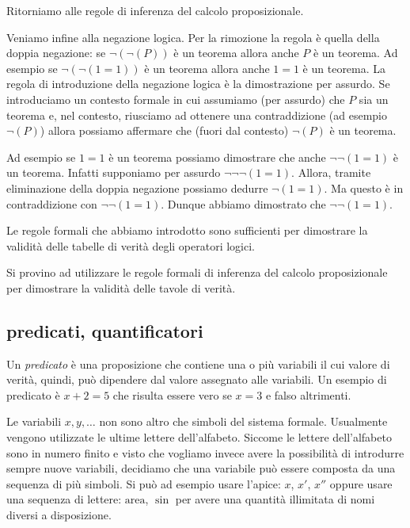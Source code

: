 Ritorniamo alle regole di inferenza del calcolo proposizionale.

Veniamo infine alla negazione logica. 
%
%
Per la rimozione la regola è quella della doppia negazione: 
se $\lnot (\lnot (P))$ è un teorema allora anche $P$ è un teorema.
Ad esempio se $\lnot (\lnot (1=1))$ è un teorema allora anche $1=1$ 
è un teorema.
%
La regola di introduzione della negazione logica è la 
dimostrazione per assurdo.
%
%
Se introduciamo un contesto formale in cui assumiamo (per assurdo)
che $P$ sia un teorema e, nel contesto, riusciamo ad ottenere 
una contraddizione (ad esempio $\lnot (P)$) allora possiamo 
affermare che (fuori dal contesto) $\lnot (P)$ è un teorema.

Ad esempio se $1=1$ è un teorema possiamo dimostrare 
che anche $\lnot \lnot (1=1)$ è un teorema.
Infatti supponiamo per assurdo $\lnot \lnot \lnot (1=1)$.
Allora, tramite eliminazione della doppia negazione possiamo 
dedurre $\lnot (1=1)$. Ma questo è in contraddizione 
con $\lnot \lnot (1=1)$. Dunque abbiamo dimostrato che 
$\lnot \lnot (1=1)$.

Le regole formali che abbiamo introdotto sono sufficienti 
per dimostrare la validità delle tabelle di verità degli 
operatori logici.

\begin{exercise}
Si provino ad utilizzare le regole formali di inferenza del 
calcolo proposizionale per dimostrare la validità delle 
tavole di verità.
\end{exercise}

\subsection{predicati, quantificatori}

Un \emph{predicato}%
%
 è una proposizione che contiene
una o più variabili il cui valore di verità, quindi,
può dipendere dal valore assegnato alle variabili.
Un esempio di predicato è $x+2=5$ che risulta essere vero se $x=3$
e falso altrimenti.

Le variabili $x,y,\dots$ non sono altro che simboli 
del sistema formale. 
Usualmente vengono utilizzate le ultime lettere dell'alfabeto.
Siccome le lettere dell'alfabeto sono in numero finito
e visto che vogliamo invece avere la possibilità di introdurre 
sempre nuove variabili, decidiamo che 
una variabile può essere composta da una sequenza di più simboli. 
Si può ad esempio usare l'apice: $x$, $x'$, $x''$ oppure 
usare una sequenza di lettere: $\textrm{area}$, $\sin$
per avere una quantità illimitata di nomi diversi a disposizione.

